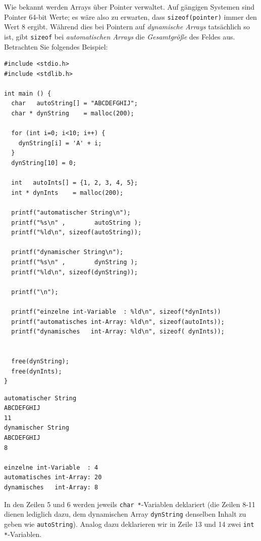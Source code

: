 Wie bekannt werden Arrays über Pointer verwaltet. Auf gängigen Systemen sind Pointer 64-bit Werte; es wäre also zu erwarten, dass \texttt{sizeof(pointer)} immer den Wert 8 ergibt. Während dies bei Pointern auf \emph{dynamische Arrays} tatsächlich so ist, gibt \texttt{sizeof} bei \emph{automatischen Arrays} die \emph{Gesamtgröße} des Feldes aus. Betrachten Sie folgendes Beispiel:

\begin{codebox}
\begin{verbatim}
#include <stdio.h>
#include <stdlib.h>

int main () {
  char   autoString[] = "ABCDEFGHIJ";
  char * dynString    = malloc(200);

  for (int i=0; i<10; i++) {
    dynString[i] = 'A' + i;
  }
  dynString[10] = 0;

  int   autoInts[] = {1, 2, 3, 4, 5};
  int * dynInts    = malloc(200);

  printf("automatischer String\n");
  printf("%s\n" ,        autoString );
  printf("%ld\n", sizeof(autoString));

  printf("dynamischer String\n");
  printf("%s\n" ,        dynString );
  printf("%ld\n", sizeof(dynString));

  printf("\n");

  printf("einzelne int-Variable  : %ld\n", sizeof(*dynInts))
  printf("automatisches int-Array: %ld\n", sizeof(autoInts));
  printf("dynamisches   int-Array: %ld\n", sizeof( dynInts));


  free(dynString);
  free(dynInts);
}
\end{verbatim}
\end{codebox}

\begin{cmdbox}
\begin{verbatim}
automatischer String
ABCDEFGHIJ
11
dynamischer String
ABCDEFGHIJ
8

einzelne int-Variable  : 4
automatisches int-Array: 20
dynamisches   int-Array: 8
\end{verbatim}
\end{cmdbox}

In den Zeilen 5 und 6 werden jeweils \texttt{char *}-Variablen deklariert (die Zeilen 8-11 dienen lediglich dazu, dem dynamischen Array \texttt{dynString} denselben Inhalt zu geben wie \texttt{autoString}). Analog dazu deklarieren wir in Zeile 13 und 14 zwei \texttt{int *}-Variablen.

